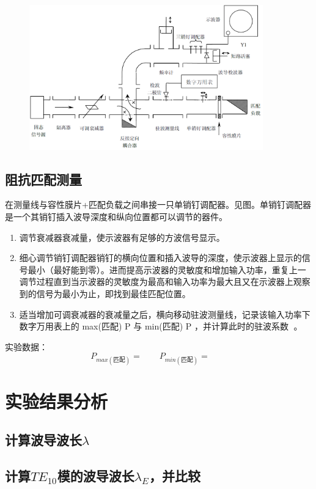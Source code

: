 \documentclass{../source/Experiment}
\begin{document}
            \begin{figure}[H]
                \centering
                \includegraphics[width = 0.9\textwidth]{pic/1-4.png}
                \caption{}
            \end{figure}

        \subsection{阻抗匹配测量}
        在测量线与容性膜片+匹配负载之间串接一只单销钉调配器。见图。单销钉调配器是一个其销钉插入波导深度和纵向位置都可以调节的器件。
        \begin{enumerate}
            \item 调节衰减器衰减量，使示波器有足够的方波信号显示。
            \item 细心调节销钉调配器销钉的横向位置和插入波导的深度，使示波器上显示的信号最小（最好能到零）。进而提高示波器的灵敏度和增加输入功率，重复上一调节过程直到当示波器的灵敏度为最高和输入功率为最大且又在示波器上观察到的信号为最小为止，即找到最佳匹配位置。
            \item 适当增加可调衰减器的衰减量之后，横向移动驻波测量线，记录该输入功率下数字万用表上的 max(匹配) P 与 min(匹配) P ，并计算此时的驻波系数 。
        \end{enumerate}
        实验数据：$$P_{max(\mbox{匹配})} = \qquad P_{min(\mbox{匹配})} = \qquad$$


    \section{实验结果分析}
        \subsection{计算波导波长$\lambda$}
        \subsection{计算$TE_{10}$模的波导波长$\lambda_E$，并比较}
\end{document}
